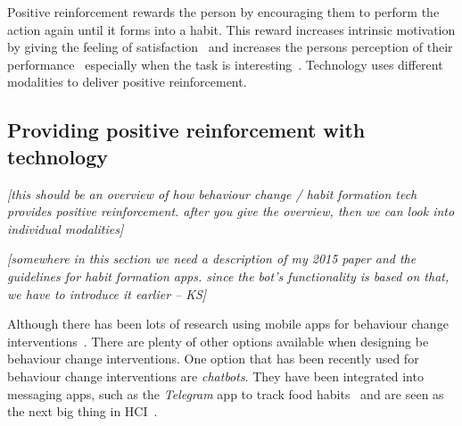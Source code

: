 \documentclass{scaffold/sigchi}
\begin{document}
Positive reinforcement rewards the person by encouraging them to perform the action again until it forms into a habit. This reward increases intrinsic motivation by giving the feeling of satisfaction~\cite{article_promoting_habit_formation} and increases the persons perception of their performance~\cite{positive_reinforcement_pro} especially when the task is interesting~\cite{article_meta_analytic_review_intrinsic_motivation}. Technology uses different modalities to deliver positive reinforcement.

\subsection{Providing positive reinforcement with technology}
\emph{[this should be an overview of how behaviour change / habit formation tech provides positive reinforcement. after you give the overview, then we can look into individual modalities]}

\emph{[somewhere in this section we need a description of my 2015 paper and the guidelines for habit formation apps. since the bot's functionality is based on that, we have to introduce it earlier -- KS]}

Although there has been lots of research using mobile apps for behaviour change interventions~\cite{survey_on_current_apps_of_steel}. There are plenty of other options available when designing be behaviour change interventions. One option that has been recently used for behaviour change interventions are \textit{chatbots}. They have been integrated into messaging apps, such as the \textit{Telegram} app to track food habits~\cite{telegram_bot_tracking_habits} and are seen as the next big thing in HCI~\cite{chatbots_and_new_world_of_hci}.
\end{document}
